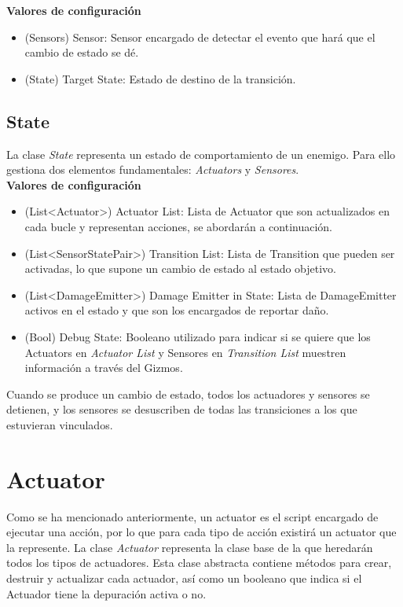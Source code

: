 \textbf{Valores de configuración}
\begin{itemize}
	\item (Sensors) Sensor: Sensor encargado de detectar el evento que hará que el cambio de estado se dé.
	\item (State) Target State: Estado de destino de la transición.
\end{itemize}

\subsection{State}

La clase \textit{State} representa un estado de comportamiento de un enemigo. Para ello gestiona dos elementos fundamentales: \textit{Actuators} y \textit{Sensores}.\\

\textbf{Valores de configuración}
\begin{itemize}
	\item (List<Actuator>) Actuator List: Lista de Actuator que son actualizados en cada bucle y representan acciones, se abordarán a continuación.
	\item (List<SensorStatePair>) Transition List: Lista de Transition que pueden ser activadas, lo que supone un cambio de estado al estado objetivo.
	\item (List<DamageEmitter>) Damage Emitter in State: Lista de DamageEmitter activos en el estado y que son los encargados de reportar daño.
	\item (Bool) Debug State: Booleano utilizado para indicar si se quiere que los Actuators en \textit{Actuator List} y Sensores en \textit{Transition List} muestren información a través del Gizmos.
\end{itemize}
Cuando se produce un cambio de estado, todos los actuadores y sensores se detienen, y los sensores se desuscriben de todas las transiciones a los que estuvieran vinculados.\\

\section{Actuator}

Como se ha mencionado anteriormente, un actuator es el script encargado de ejecutar una acción, por lo que para cada tipo de acción existirá un actuator que la represente.
La clase \textit{Actuator} representa la clase base de la que heredarán todos los tipos de actuadores.
Esta clase abstracta contiene métodos para crear, destruir y actualizar cada actuador, así como un booleano que indica si el Actuador tiene la depuración activa o no.\\

